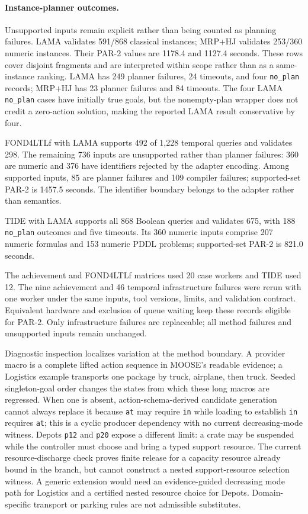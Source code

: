 \paragraph{Instance-planner outcomes.}
Unsupported inputs remain explicit rather than being counted as planning
failures.
LAMA validates 591/868 classical instances; MRP+HJ validates 253/360 numeric
instances. Their PAR-2 values are 1178.4 and 1127.4 seconds.
These rows cover disjoint fragments and
are interpreted within scope rather than as a same-instance ranking. LAMA has
249 planner failures, 24 timeouts, and four \texttt{no\_plan} records; MRP+HJ
has 23 planner failures and 84 timeouts. The four LAMA \texttt{no\_plan} cases
have initially true goals, but the nonempty-plan wrapper does not credit a
zero-action solution, making the reported LAMA result conservative by four.

FOND4LTLf with LAMA supports 492 of 1,228 temporal queries and validates 298.
The remaining 736 inputs are unsupported rather than planner
failures: 360 are numeric and 376 have identifiers rejected by the adapter
encoding. Among supported inputs, 85 are planner failures and 109 compiler
failures; supported-set PAR-2 is 1457.5 seconds. The
identifier boundary belongs to the adapter rather than \ltlf{} semantics.

TIDE with LAMA supports all 868 Boolean queries and validates 675, with 188
\texttt{no\_plan} outcomes and five timeouts. Its 360 numeric inputs comprise 207
numeric formulas and 153 numeric PDDL problems; supported-set PAR-2 is
821.0 seconds.

The achievement and FOND4LTLf matrices used 20 case workers and TIDE used 12.
The nine achievement and 46 temporal infrastructure failures were rerun with
one worker under the same inputs, tool versions, limits, and validation
contract. Equivalent hardware and exclusion of queue waiting keep these records
eligible for PAR-2. Only infrastructure failures are replaceable; all method
failures and unsupported inputs remain unchanged.

Diagnostic inspection localizes variation at the method boundary. A provider
macro is a complete lifted action sequence in MOOSE's readable evidence; a Logistics
example transports one package by truck, airplane, then truck. Seeded
singleton-goal order changes the states from which these long macros are
regressed. When one is absent, action-schema-derived candidate generation cannot always
replace it because
\texttt{at} may require \texttt{in} while loading to establish \texttt{in}
requires \texttt{at}; this is a cyclic producer dependency with no current
decreasing-mode witness. Depots \texttt{p12} and \texttt{p20} expose a
different limit: a crate may be suspended while the controller must choose and
bring a typed support resource. The current resource-discharge check proves
finite release for a capacity resource already bound in the branch, but cannot
construct a nested support-resource selection witness. A generic extension would need an
evidence-guided decreasing mode path for Logistics and a certified nested
resource choice for Depots. Domain-specific transport or parking rules are not
admissible substitutes.

